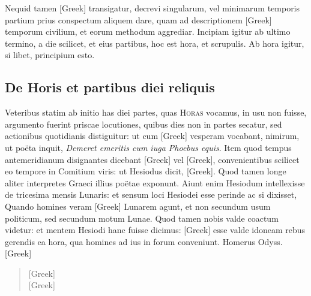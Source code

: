Nequid tamen
\textgreek{[Greek]} transigatur, decrevi singularum, vel
 minimarum temporis
partium prius conspectum aliquem dare, quam ad descriptionem
\textgreek{[Greek]} temporum civilium, et eorum methodum aggrediar.
Incipiam igitur ab ultimo termino, a die scilicet, et eius partibus,
hoc est hora, et scrupulis.
Ab hora igitur, si libet, principium esto.

\subsection{De Horis et partibus diei reliquis}

Veteribus statim ab initio has diei partes, quas \textsc{Horas}
vocamus, in usu non fuisse, argumento fuerint priscae locutiones,
quibus dies non in partes secatur, sed actionibus quotidianis
distiguitur: ut cum \textgreek{[Greek]} vesperam vocabant, 
nimirum, ut poëta
inquit, \textit{Demeret emeritis cum iuga Phoebus equis}.
Item quod tempus
antemeridianum disignantes dicebant \textgreek{[Greek]}
 vel \textgreek{[Greek]},
convenientibus scilicet eo tempore in Comitium viris: ut Hesiodus dicit,
\textgreek{[Greek]}.
Quod tamen longe aliter interpretes
Graeci illius poëtae exponunt.
Aiunt enim Hesiodum intellexisse
de tricesima mensis Lunaris: et sensum loci Hesiodei esse perinde
ac si dixisset, Quando homines veram \textgreek{[Greek]} Lunarem agunt, et
non secundum usum politicum, sed secundum motum Lunae.
Quod
tamen nobis valde coactum videtur: et mentem Hesiodi hanc fuisse dicimus:
\textgreek{[Greek]} esse valde idoneam rebus gerendis ea hora,
 qua homines
ad ius in forum conveniunt.
Homerus Odyss. \textgreek{[Greek]}
\begin{quote}
\textgreek{[Greek]}\\
\textgreek{[Greek]}
\end{quote}


